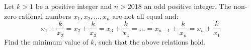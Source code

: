 Let $k > 1$ be a positive integer and $n > 2018$ an odd positive integer. The non-zero rational numbers $x_1,x_2,\ldots,x_n$ are not all equal and:$$x_1+\frac{k}{x_2}=x_2+\frac{k}{x_3}=x_3+\frac{k}{x_4}=\ldots=x_{n-1}+\frac{k}{x_n}=x_n+\frac{k}{x_1}$$Find the minimum value of $k$, such that the above relations hold.
